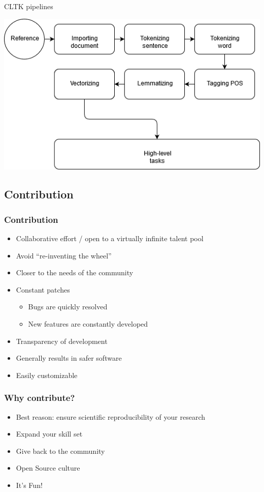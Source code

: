 \documentclass{beamer}
\begin{document}
\begin{frame}{CLTK pipelines}
\begin{center}
    \includegraphics[scale=0.5]{cltk_pipelines-cltk_pipelines_executing.png}
    \end{center}
\end{frame}


\subsection{Contribution}

\begin{frame}
\frametitle{Contribution}
\begin{itemize}
    \item Collaborative effort / open to a virtually infinite talent pool
    \item Avoid “re-inventing the wheel”
    \item Closer to the needs of the community
    \item Constant patches 
    \begin{itemize}
    \item Bugs are quickly resolved 
    \item New features are constantly developed
    
    \end{itemize}
    \item Transparency of development
    \item Generally results in safer software
    \item Easily customizable
\end{itemize}
\end{frame}

\begin{frame}
\frametitle{Why contribute?}
\begin{itemize}
    \item Best reason: ensure scientific reproducibility of your research
    \item Expand your skill set
    \item Give back to the community
    \item Open Source culture
    \item It’s Fun!
\end{itemize}
\end{frame}
\end{document}
